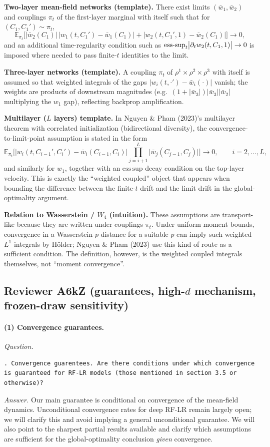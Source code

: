 \documentclass[11pt,a4paper]{article}
\newcommand{\NP}{Nguyen \& Pham (2023)}
\begin{document}
\textbf{Two-layer mean-field networks (template).} There exist limits $(\bar w_1,\bar w_2)$ and couplings $\pi_t$ of the first-layer marginal with itself such that for $(C_1,C_1')\sim\pi_t$,
\[
\mathbb{E}_{\pi_t}\Big[|\bar w_2(C_1)|\,|w_1(t,C_1')-\bar w_1(C_1)|+|w_2(t,C_1',1)-\bar w_2(C_1)|\Big]\to 0,
\]
and an additional time-regularity condition such as ${\rm ess\text{-}sup}_t\big|\partial_t w_2(t,C_1,1)\big|\to 0$ is imposed where needed to pass finite-$t$ identities to the limit.

\textbf{Three-layer networks (template).} A coupling $\pi_t$ of $\rho^1\times\rho^2\times\rho^3$ with itself is assumed so that weighted integrals of the gaps $|w_i(t,\cdot')-\bar w_i(\cdot)|$ vanish; the weights are products of downstream magnitudes (e.g.\ $(1+|\bar w_3|)|\bar w_3||\bar w_2|$ multiplying the $w_1$ gap), reflecting backprop amplification.

\textbf{Multilayer ($L$ layers) template.} In \NP{}'s multilayer theorem with correlated initialization (bidirectional diversity), the convergence-to-limit-point assumption is stated in the form
\[
\mathbb{E}_{\pi_t}\Big[\big|w_i(t,C_{i-1}',C_i')-\bar w_i(C_{i-1},C_i)\big|\prod_{j=i+1}^{L}\big|\bar w_j(C_{j-1},C_j)\big|\Big]\to 0,\qquad i=2,\ldots,L,
\]
and similarly for $w_1$, together with an $\mathrm{ess\,sup}$ decay condition on the top-layer velocity. This is exactly the ``weighted coupled'' object that appears when bounding the difference between the finite-$t$ drift and the limit drift in the global-optimality argument.

\textbf{Relation to Wasserstein / $W_4$ (intuition).} These assumptions are transport-like because they are written under couplings $\pi_t$. Under uniform moment bounds, convergence in a Wasserstein-$p$ distance for a suitable $p$ can imply such weighted $L^1$ integrals by Hölder; \NP{} use this kind of route as a sufficient condition. The definition, however, is the weighted coupled integrals themselves, not ``moment convergence''.


\subsection*{Reviewer A6kZ (guarantees, high-$d$ mechanism, frozen-draw sensitivity)}

\paragraph{(1) Convergence guarantees.}
\textit{Question.}\par
\begin{verbatim}
. Convergence guarentees. Are there conditions under which convergence is guaranteed for RF-LR models (those mentioned in section 3.5 or otherwise)?
\end{verbatim}
\textit{Answer.} Our main guarantee is conditional on convergence of the mean-field dynamics. Unconditional convergence rates for deep RF-LR remain largely open; we will clarify this and avoid implying a general unconditional guarantee. We will also point to the sharpest partial results available and clarify which assumptions are sufficient for the global-optimality conclusion \emph{given} convergence.
\end{document}
